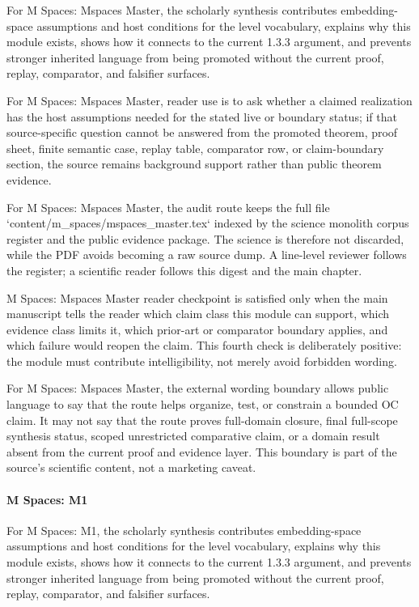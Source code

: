 For M Spaces: Mspaces Master, the scholarly synthesis contributes embedding-space assumptions and host conditions for the level vocabulary, explains why this module exists, shows how it connects to the current 1.3.3 argument, and prevents stronger inherited language from being promoted without the current proof, replay, comparator, and falsifier surfaces.


For M Spaces: Mspaces Master, reader use is to ask whether a claimed realization has the host assumptions needed for the stated live or boundary status; if that source-specific question cannot be answered from the promoted theorem, proof sheet, finite semantic case, replay table, comparator row, or claim-boundary section, the source remains background support rather than public theorem evidence.


For M Spaces: Mspaces Master, the audit route keeps the full file `content/m\_spaces/mspaces\_master.tex` indexed by the science monolith corpus register and the public evidence package. The science is therefore not discarded, while the PDF avoids becoming a raw source dump. A line-level reviewer follows the register; a scientific reader follows this digest and the main chapter.


M Spaces: Mspaces Master reader checkpoint is satisfied only when the main manuscript tells the reader which claim class this module can support, which evidence class limits it, which prior-art or comparator boundary applies, and which failure would reopen the claim. This fourth check is deliberately positive: the module must contribute intelligibility, not merely avoid forbidden wording.


For M Spaces: Mspaces Master, the external wording boundary allows public language to say that the route helps organize, test, or constrain a bounded OC claim. It may not say that the route proves full-domain closure, final full-scope synthesis status, scoped unrestricted comparative claim, or a domain result absent from the current proof and evidence layer. This boundary is part of the source's scientific content, not a marketing caveat.


\paragraph{M Spaces: M1}

For M Spaces: M1, the scholarly synthesis contributes embedding-space assumptions and host conditions for the level vocabulary, explains why this module exists, shows how it connects to the current 1.3.3 argument, and prevents stronger inherited language from being promoted without the current proof, replay, comparator, and falsifier surfaces.


